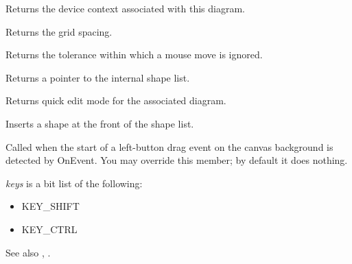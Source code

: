 

Returns the device context associated with this diagram.



Returns the grid spacing.



Returns the tolerance within which a mouse move is ignored.



Returns a pointer to the internal shape list.



Returns quick edit mode for the associated diagram.



Inserts a shape at the front of the shape list.

\label{onbegindragleft}


Called when the start of a left-button drag event on the canvas background is detected by OnEvent. You may override this member;
by default it does nothing.

{\it keys} is a bit list of the following:

\begin{itemize}\itemsep=0pt
\item KEY\_SHIFT
\item KEY\_CTRL
\end{itemize}

See also , .

\label{onbegindragright}


